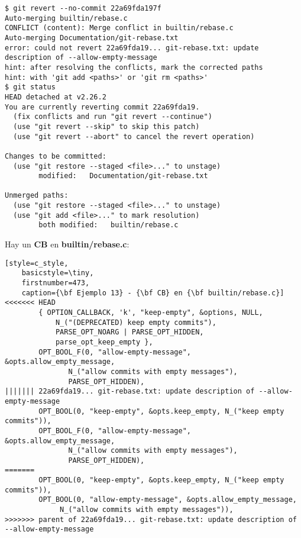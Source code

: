 \begin{lstlisting}[style=console_style,
	basicstyle=\small,
	caption={\bf Ejemplo 13} - Revirtiendo]
$ git revert --no-commit 22a69fda197f
Auto-merging builtin/rebase.c
CONFLICT (content): Merge conflict in builtin/rebase.c
Auto-merging Documentation/git-rebase.txt
error: could not revert 22a69fda19... git-rebase.txt: update description of --allow-empty-message
hint: after resolving the conflicts, mark the corrected paths
hint: with 'git add <paths>' or 'git rm <paths>'
$ git status
HEAD detached at v2.26.2
You are currently reverting commit 22a69fda19.
  (fix conflicts and run "git revert --continue")
  (use "git revert --skip" to skip this patch)
  (use "git revert --abort" to cancel the revert operation)

Changes to be committed:
  (use "git restore --staged <file>..." to unstage)
        modified:   Documentation/git-rebase.txt

Unmerged paths:
  (use "git restore --staged <file>..." to unstage)
  (use "git add <file>..." to mark resolution)
        both modified:   builtin/rebase.c
\end{lstlisting}

Hay un {\bf CB} en {\bf builtin/rebase.c}:
\begin{lstlisting}[style=c_style,
	basicstyle=\tiny,
	firstnumber=473,
	caption={\bf Ejemplo 13} - {\bf CB} en {\bf builtin/rebase.c}]
<<<<<<< HEAD
		{ OPTION_CALLBACK, 'k', "keep-empty", &options, NULL,
			N_("(DEPRECATED) keep empty commits"),
			PARSE_OPT_NOARG | PARSE_OPT_HIDDEN,
			parse_opt_keep_empty },
		OPT_BOOL_F(0, "allow-empty-message", &opts.allow_empty_message,
			   N_("allow commits with empty messages"),
			   PARSE_OPT_HIDDEN),
||||||| 22a69fda19... git-rebase.txt: update description of --allow-empty-message
		OPT_BOOL(0, "keep-empty", &opts.keep_empty, N_("keep empty commits")),
		OPT_BOOL_F(0, "allow-empty-message", &opts.allow_empty_message,
			   N_("allow commits with empty messages"),
			   PARSE_OPT_HIDDEN),
=======
		OPT_BOOL(0, "keep-empty", &opts.keep_empty, N_("keep empty commits")),
		OPT_BOOL(0, "allow-empty-message", &opts.allow_empty_message,
			 N_("allow commits with empty messages")),
>>>>>>> parent of 22a69fda19... git-rebase.txt: update description of --allow-empty-message
\end{lstlisting}

